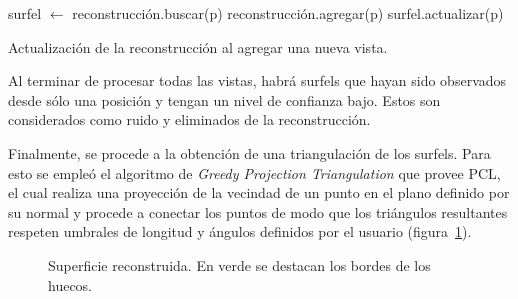 	\begin{algorithm}
		\begin{algorithmic}[1]
					\State surfel $\gets$ reconstrucción.buscar(p)
						\State reconstrucción.agregar(p)
					\Else
						\State surfel.actualizar(p)
					\EndIf
				\EndFor
			\EndFunction
		\end{algorithmic}
		\caption[Actualización de la reconstrucción al agregar una nueva vista]{\label{alg:surfel}Actualización de la reconstrucción al agregar una nueva vista.}
	\end{algorithm}

	Al terminar de procesar todas las vistas, habrá surfels que hayan sido
	observados desde sólo una posición y tengan un nivel de confianza bajo.
	Estos son considerados como ruido y eliminados de la
	reconstrucción.

	Finalmente, se procede a la obtención de una triangulación de los surfels.
	Para esto se empleó el algoritmo de \emph{Greedy Projection Triangulation} que provee PCL,
	el cual realiza una proyección de la vecindad de un punto en el plano definido por su normal
	y procede a conectar los puntos de modo que los triángulos resultantes
	respeten umbrales de longitud y ángulos definidos por el usuario (figura~\ref{fig:surface}).

	\begin{figure}

		\caption[Superficie reconstruida]{\label{fig:surface}Superficie reconstruida. En verde se destacan los bordes de los huecos.}
	\end{figure}
